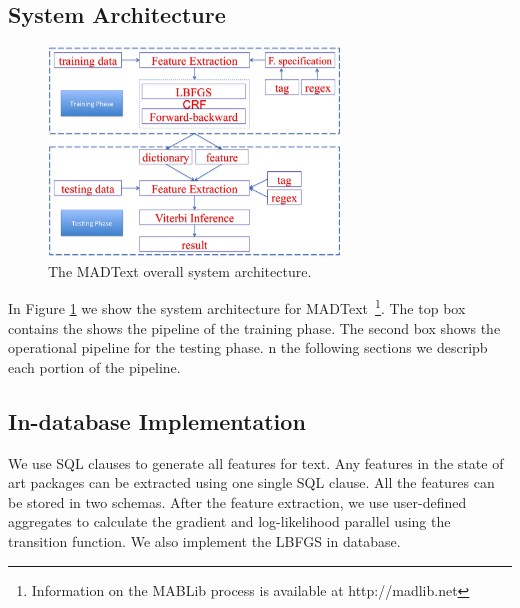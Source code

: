 \documentclass[11pt,letterpaper]{article}
\begin{document}
\subsection{System Architecture}
\begin{figure}
\centering
\includegraphics[height=15em]{system.png}
\caption{The MADText overall system architecture.}
\label{fig:systemarch}
\end{figure}

In Figure \ref{fig:systemarch} we show the system architecture for MADText~\footnote{Information on the MABLib process is available at http://madlib.net}. 
The top box contains the shows  the pipeline of the training phase. 
The second box shows the operational pipeline for the testing phase.
n the following sections we descripb each portion of the pipeline.

\subsection{In-database Implementation}
We use SQL clauses to generate all features for text. Any features in the state of art packages can be extracted using one single SQL clause.
All the features can be stored in two schemas. 
After the feature extraction, we use user-defined aggregates to calculate the gradient and log-likelihood parallel using the transition function.
We also implement the LBFGS in database. 
\end{document}

